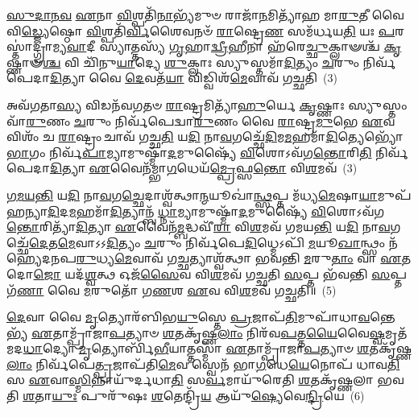 \-\ul{𑌸𑍁}\-\-\ul{𑌦𑌾}\-\-\ul{𑌨}\-\-\ul{𑌵} \ul{𑌏}\-𑌨𑌾 \ul{𑌵𑌿}\-𑌶𑍍𑌪𑌤𑌿᳴\-\ul{𑌨𑌾}\-𑌭𑍍𑌯᳴𑌮𑍁𑍞 𑌰𑌾𑌜𑌾᳴\-\ul{𑌨}\-𑌮𑌿𑌤𑍍𑌯𑌾᳴𑌹 𑌮𑌾\-\ul{𑌰𑍁}\-𑌤𑍀 𑌵𑍈 𑌵𑌿\-\ul{𑌡𑍍𑌜𑍍𑌯𑍇}\-𑌷𑍍𑌠𑍋 \ul{𑌵𑌿}\-𑌶𑍍𑌪𑌤𑌿᳴\-\ul{𑌰𑍍𑌵𑌿}\-𑌶𑍈𑌵𑌨𑍞᳴ \ul{𑌰𑌾}\-𑌷𑍍𑌟𑍍𑌰𑍇\-\ul{𑌣} 𑌸𑌮᳴𑌰𑍍𑌧𑌯\-\ul{𑌤𑌿} 𑌯𑌃 \ul{𑌪}\-𑌰𑌸𑍍𑌤𑌾॑𑌦𑍍𑌗𑍍𑌰𑌾𑌮𑍍𑌯\-\ul{𑌵𑌾}\-𑌦𑍀 𑌸𑍍𑌯𑌾𑌤𑍍𑌤𑌸𑍍𑌯᳴ \ul{𑌗𑍃}\-𑌹𑌾\-\ul{𑌦𑍍𑌵𑍍𑌰𑍀}\-𑌹𑍀𑌨𑌾 𑌹᳴𑌰𑍇\-\ul{𑌚𑍍𑌛𑍁}\-𑌕𑍍𑌲𑌾𑍟𑌶𑍍𑌚᳴ \ul{𑌕𑍃}\-𑌷𑍍𑌣𑌾𑍟\-\ul{𑌶𑍍𑌚} 𑌵𑌿 𑌚𑌿᳴𑌨𑍁\-\ul{𑌯𑌾}\-𑌦𑍍𑌯𑍇 \ul{𑌶𑍁}\-𑌕𑍍𑌲𑌾𑌃 𑌸𑍍𑌯𑍁𑌸𑍍𑌤𑌮𑌾᳴\-\ul{𑌦𑌿}\-𑌤𑍍𑌯𑌂 \ul{𑌚}\-𑌰𑍁𑌂 𑌨𑌿𑌰𑍍𑌵᳴𑌪𑍇𑌦𑌾\-\ul{𑌦𑌿}\-𑌤𑍍𑌯𑌾 𑌵𑍈 \ul{𑌦𑍇}\-𑌵𑌤᳴\-\ul{𑌯𑌾} 𑌵𑌿𑌡𑍍𑌵𑌿𑌶᳴\-\ul{𑌮𑍇}\-𑌵𑌾𑌵᳴ 𑌗𑌚𑍍𑌛𑌤𑌿~(3)

𑌅𑌵᳴𑌗𑌤𑌾\-\ul{𑌸𑍍𑌯} 𑌵𑌿𑌡𑌨᳴𑌵𑌗𑌤𑍞 \ul{𑌰𑌾}\-𑌷𑍍𑌟𑍍𑌰𑌮𑌿𑌤𑍍𑌯𑌾᳴\-\ul{𑌹𑍁}\-𑌰𑍍𑌯𑍇 \ul{𑌕𑍃}\-𑌷𑍍𑌣𑌾𑌃 𑌸𑍍𑌯𑍁𑌸𑍍𑌤𑌂 𑌵𑌾᳴\-\ul{𑌰𑍁}\-𑌣𑌂 \ul{𑌚}\-𑌰𑍁𑌂 𑌨𑌿𑌰𑍍𑌵᳴𑌪𑍇𑌦𑍍𑌵𑌾\-\ul{𑌰𑍁}\-𑌣𑌂 𑌵𑍈 \ul{𑌰𑌾}\-𑌷𑍍𑌟𑍍𑌰\-\ul{𑌮𑍁}\-𑌭𑍇 \ul{𑌏}\-𑌵 𑌵𑌿𑌶𑌂᳴ 𑌚 \ul{𑌰𑌾}\-𑌷𑍍𑌟𑍍𑌰𑌂 𑌚𑌾𑌵᳴ 𑌗𑌚𑍍𑌛\-\ul{𑌤𑌿} 𑌯\-\ul{𑌦𑌿} 𑌨𑌾\-\ul{𑌵}\-𑌗𑌚𑍍𑌛𑍇᳴\-\ul{𑌦𑌿}\-𑌮\-\ul{𑌮}\-𑌹𑌮𑌾᳴\-\ul{𑌦𑌿}\-𑌤𑍍𑌯𑍇𑌭𑍍𑌯𑍋᳴ \ul{𑌭𑌾}\-𑌗𑌂 𑌨𑌿𑌰𑍍𑌵᳴\-\ul{𑌪𑌾}\-𑌮𑍍𑌯𑌾𑌮𑍁𑌷𑍍𑌮𑌾᳴\-\ul{𑌦}\-𑌮𑍁𑌷𑍍𑌯𑍈᳴ \ul{𑌵𑌿}\-𑌶𑍋\-𑌽𑌵᳴𑌗\-\ul{𑌨𑍍𑌤𑍋}\-𑌰𑌿\-\ul{𑌤𑌿} 𑌨𑌿𑌰𑍍𑌵᳴𑌪𑍇𑌦𑌾\-\ul{𑌦𑌿}\-𑌤𑍍𑌯𑌾 \ul{𑌏}\-𑌵𑍈𑌨᳴𑌮𑍍𑌭𑌾\-\ul{𑌗}\-𑌧𑍇𑌯᳴\-\ul{𑌮𑍍𑌪𑍍𑌰𑍇}\-𑌫𑍍𑌸\-\ul{𑌨𑍍𑌤𑍋} 𑌵𑌿\-\ul{𑌶}\-𑌮𑌵᳴~(3)

\-\ul{𑌗}\-\-\ul{𑌮}\-\-\ul{𑌯}\-\-\ul{𑌨𑍍𑌤𑌿} 𑌯\-\ul{𑌦𑌿} 𑌨𑌾\-\ul{𑌵}\-𑌗\-\ul{𑌚𑍍𑌛𑍇}\-𑌦𑌾𑌶𑍍𑌵᳴𑌤𑍍𑌥𑌾\-\ul{𑌨𑍍𑌮}\-𑌯𑍂𑌖𑌾॑\-\ul{𑌨𑍍𑌥𑍍𑌸}\-𑌪𑍍𑌤 𑌮᳴𑌧𑍍𑌯\-\ul{𑌮𑍇}\-𑌷𑌾\-\ul{𑌯𑌾}\-𑌮𑍁𑌪᳴ 𑌹𑌨𑍍𑌯𑌾\-\ul{𑌦𑌿}\-𑌦\-\ul{𑌮}\-𑌹𑌮𑌾᳴\-\ul{𑌦𑌿}\-𑌤𑍍𑌯𑌾𑌨𑍍𑌬᳴\-\ul{𑌧𑍍𑌨𑌾}\-𑌮𑍍𑌯𑌾𑌮𑍁𑌷𑍍𑌮𑌾᳴\-\ul{𑌦}\-𑌮𑍁𑌷𑍍𑌯𑍈᳴ \ul{𑌵𑌿}\-𑌶𑍋\-𑌽𑌵᳴𑌗\-\ul{𑌨𑍍𑌤𑍋}\-𑌰𑌿𑌤𑍍𑌯𑌾᳴\-\ul{𑌦𑌿}\-𑌤𑍍𑌯𑌾 \ul{𑌏}\-𑌵𑍈𑌨᳴\-\ul{𑌮𑍍𑌬}\-𑌦𑍍𑌧𑌵𑍀᳴\-\ul{𑌰𑌾} 𑌵𑌿\-\ul{𑌶}\-𑌮𑌵᳴ 𑌗𑌮𑌯\-\ul{𑌨𑍍𑌤𑌿} 𑌯\-\ul{𑌦𑌿} 𑌨𑌾\-\ul{𑌵}\-𑌗𑌚𑍍𑌛𑍇᳴\-\ul{𑌦𑍇}\-𑌤\-\ul{𑌮𑍇}\-𑌵𑌾𑌽𑌽\-\ul{𑌦𑌿}\-𑌤𑍍𑌯𑌂 \ul{𑌚}\-𑌰𑍁𑌂 𑌨𑌿𑌰𑍍𑌵᳴𑌪𑍇\-\ul{𑌦𑌿}\-𑌧𑍍𑌮𑍇\-𑌽𑌪𑌿᳴ \ul{𑌮}\-𑌯𑍂\-\ul{𑌖𑌾}\-𑌨𑍍𑌥𑍍𑌸𑌂 𑌨᳴𑌹𑍍𑌯𑍇𑌦𑌨𑌪\-\ul{𑌰𑍁}\-𑌧𑍍𑌯\-\ul{𑌮𑍇}\-𑌵𑌾𑌵᳴ 𑌗\-\ul{𑌚𑍍𑌛}\-𑌤𑍍𑌯𑌾𑌶𑍍𑌵᳴𑌤𑍍𑌥𑌾 𑌭𑌵𑌨𑍍𑌤𑌿 \ul{𑌮}\-𑌰𑍁\-\ul{𑌤𑌾𑌂} 𑌵𑌾 \ul{𑌏}\-𑌤𑌦𑍋\-\ul{𑌜𑍋} 𑌯𑌦᳴\-\ul{𑌶𑍍𑌵}\-𑌤𑍍𑌥 𑌓𑌜᳴\-\ul{𑌸𑍈}\-𑌵 𑌵𑌿\-\ul{𑌶}\-𑌮𑌵᳴ 𑌗𑌚𑍍𑌛𑌤𑌿 \ul{𑌸}\-𑌪𑍍𑌤 𑌭᳴𑌵𑌨𑍍𑌤𑌿 \ul{𑌸}\-𑌪𑍍𑌤𑌗᳴\-\ul{𑌣𑌾} 𑌵𑍈 \ul{𑌮}\-𑌰𑍁𑌤𑍋᳴ 𑌗\-\ul{𑌣}\-𑌶 \ul{𑌏}\-𑌵 𑌵𑌿\-\ul{𑌶}\-𑌮𑌵᳴ 𑌗𑌚𑍍𑌛𑌤𑌿॥~(5)

{\anuvakamend[{\-\ul{𑌧𑌾}\-𑌰𑌯᳴𑌦𑍍𑌵𑌤𑍋 𑌮𑌰𑍁𑌤𑍋 𑌗𑌚𑍍𑌛\-\ul{𑌤𑌿} 𑌵𑌿\-\ul{𑌶}\-𑌮\-\ul{𑌵𑍈}\-𑌤\-\ul{𑌦}\-𑌷𑍍𑌟𑌾𑌦᳴𑌶 𑌚}]}%

\-\ul{𑌦𑍇}\-𑌵𑌾 𑌵𑍈 \ul{𑌮𑍃}\-𑌤𑍍𑌯𑍋𑌰᳴𑌬𑌿𑌭\-\ul{𑌯𑍁}\-𑌸𑍍𑌤𑍇 \ul{𑌪𑍍𑌰}\-𑌜𑌾𑌪᳴\-\ul{𑌤𑌿}\-𑌮𑍁𑌪𑌾᳴𑌧𑌾\-\ul{𑌵}\-𑌨𑍍𑌤𑍇𑌭𑍍𑌯᳴ \ul{𑌏}\-𑌤𑌾𑌮𑍍𑌪𑍍𑌰𑌾᳴𑌜𑌾\-\ul{𑌪}\-𑌤𑍍𑌯𑌾𑍞 \ul{𑌶}\-𑌤𑌕𑍃᳴𑌷𑍍𑌣\-\ul{𑌲𑌾𑌂} 𑌨𑌿𑌰᳴𑌵\-\ul{𑌪}\-𑌤𑍍𑌤\-\ul{𑌯𑍈}\-𑌵𑍈\-\ul{𑌷𑍍𑌵}\-𑌮𑍃𑌤᳴𑌮𑌦\-\ul{𑌧𑌾}\-𑌦𑍍𑌯𑍋 \ul{𑌮𑍃}\-𑌤𑍍𑌯𑍋𑌰𑍍𑌬𑌿᳴\-\ul{𑌭𑍀}\-𑌯𑌾𑌤𑍍𑌤𑌸𑍍𑌮𑌾᳴ \ul{𑌏}\-𑌤𑌾𑌮𑍍𑌪𑍍𑌰𑌾᳴𑌜𑌾\-\ul{𑌪}\-𑌤𑍍𑌯𑌾𑍞 \ul{𑌶}\-𑌤𑌕𑍃᳴𑌷𑍍𑌣\-\ul{𑌲𑌾𑌂} 𑌨𑌿𑌰𑍍𑌵᳴𑌪𑍇\-\ul{𑌤𑍍𑌪𑍍𑌰}\-𑌜𑌾𑌪᳴𑌤𑌿\-\ul{𑌮𑍇}\-𑌵 𑌸𑍍𑌵𑍇𑌨᳴ 𑌭𑌾\-\ul{𑌗}\-𑌧𑍇\-\ul{𑌯𑍇}\-𑌨𑍋𑌪᳴ 𑌧𑌾𑌵\-\ul{𑌤𑌿} 𑌸 \ul{𑌏}\-𑌵𑌾\-\ul{𑌸𑍍𑌮𑌿}\-𑌨𑍍𑌨𑌾𑌯𑍁᳴𑌰𑍍𑌦𑌧𑌾\-\ul{𑌤𑌿} 𑌸\-\ul{𑌰𑍍𑌵}\-𑌮𑌾𑌯𑍁᳴𑌰𑍇𑌤𑌿 \ul{𑌶}\-𑌤𑌕𑍃᳴𑌷𑍍𑌣𑌲𑌾 𑌭𑌵𑌤𑌿 \ul{𑌶}\-𑌤𑌾\-\ul{𑌯𑍁𑌃} 𑌪𑍁𑌰𑍁᳴𑌷𑌃 \ul{𑌶}\-𑌤𑍇𑌨𑍍𑌦𑍍𑌰𑌿᳴\-\ul{𑌯} 𑌆𑌯𑍁᳴\-\ul{𑌷𑍍𑌯𑍇}\-𑌵𑍇\-\ul{𑌨𑍍𑌦𑍍𑌰𑌿}\-𑌯𑍇~(6)

